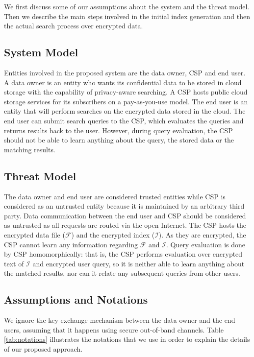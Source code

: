 We first discuss some of our assumptions
about the system and the threat model. Then we describe the main
steps involved in the initial index generation
and then the actual search process over encrypted data.

\subsection{System Model}

Entities involved in the proposed system are the data owner, CSP and end user.
A data owner is an entity who wants its confidential data to be stored in cloud storage with the capability of privacy-aware searching. 
A CSP hosts public cloud storage services for its subscribers on 
a pay-as-you-use model. The end user is an entity that will perform searches on the 
encrypted data stored in the cloud. The end user can submit search queries 
to the CSP, which evaluates the queries and returns results back to the user. 
However, during query evaluation, the CSP should not be able to learn anything about the query, 
the stored data or the matching results.

\subsection{Threat Model}

The data owner and end user are considered trusted entities while CSP 
is considered as an untrusted entity because it is maintained by an 
arbitrary third party. Data communication between the end user and CSP should 
be considered as untrusted as all requests are routed via the open Internet. 
The CSP hosts the encrypted data file ($\mathcal{F}$) and the encrypted index ($\mathcal{I}$). 
As they are encrypted, the CSP cannot learn any information regarding $\mathcal{F}$ and $\mathcal{I}$. 
Query evaluation is done by CSP homomorphically: that is, the CSP performs 
evaluation over encrypted text of $\mathcal{I}$ and encrypted user query, 
so it is neither able to learn anything about the matched results, nor
can it relate any subsequent queries from other users. 

\subsection{Assumptions and Notations}

We ignore the key exchange mechanism between the data owner and the end users, assuming
that it happens using secure out-of-band channels.
Table \ref{tab:notations} illustrates the notations that we use in order to explain
the details of our proposed approach.



